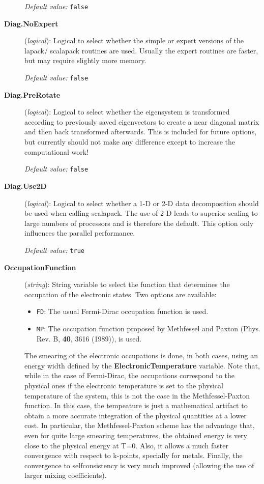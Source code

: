 \documentclass[11pt]{article}
\begin{document}
\begin{description}
{\it Default value:} {\tt false}

\item[{\bf Diag.NoExpert}] ({\it logical}): 
Logical to select whether the simple or expert versions of the lapack/
scalapack routines are used. Usually the expert routines are faster, but
may require slightly more memory.

{\it Default value:} {\tt false}

\item[{\bf Diag.PreRotate}] ({\it logical}): 
Logical to select whether the eigensystem is transformed according to 
previously saved eigenvectors to create a near diagonal matrix and then 
back transformed afterwards. This is included for future options, but
currently should not make any difference except to increase the 
computational work!

{\it Default value:} {\tt false}

\item[{\bf Diag.Use2D}] ({\it logical}): 
Logical to select whether a 1-D or 2-D data decomposition should be used
when calling scalapack. The use of 2-D leads to superior scaling to 
large numbers of processors and is therefore the default. This option 
only influences the parallel performance.

{\it Default value:} {\tt true}


\item[{\bf OccupationFunction}]({\it string}):
String variable to select the function that determines the occupation
of the electronic states. Two options are available:
\begin{itemize}
\item {\tt FD}: The usual Fermi-Dirac occupation function is used.
\item {\tt MP}: The occupation function proposed by Methfessel and 
Paxton (Phys. Rev. B, {\bf 40}, 3616 (1989)), is used.
\end{itemize}
The smearing of the electronic occupations is done, in both cases,
using an energy width defined by the {\bf ElectronicTemperature}
variable. Note that, while in the case of Fermi-Dirac, the occupations
correspond to the physical ones if the electronic temperature is
set to the physical temperature of the system, this is not the case
in the Methfessel-Paxton function. In this case, the tempeature
is just a mathematical artifact to obtain a more accurate
integration of the physical quantities at a lower cost. In
particular, the Methfessel-Paxton scheme has the advantage
that, even for quite large smearing temperatures, the 
obtained energy is very close to the physical energy at T=0.
Also, it allows a much faster convergence with respect to
k-points, specially for metals. Finally, the convergence to
selfconsistency is very much improved (allowing the use
of larger mixing coefficients).


\end{description}
\end{document}
